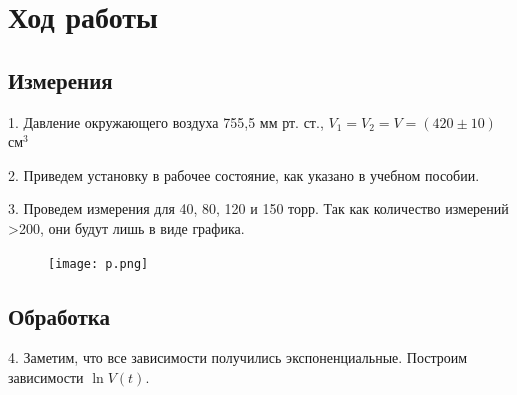 \section{Ход работы}
\subsection{Измерения}
1. Давление окружающего воздуха 755,5 мм рт. ст.,
$V_1 = V_2 = V = (420 \pm 10)$ см$^3$

2. Приведем установку в рабочее состояние, как указано в учебном пособии.

3. Проведем измерения для 40, 80, 120 и 150 торр. Так как количество измерений >200, они будут лишь в виде графика.

\begin{figure}[h]
    \texttt{[image: p.png]}
\end{figure}

\subsection{Обработка}
4. Заметим, что все зависимости получились экспоненциальные. Построим зависимости $\ln V(t)$.

